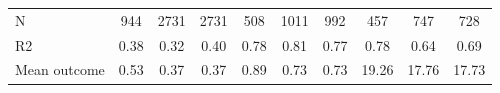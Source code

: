 \begin{tabular}{lccc|ccc|ccc}
N           &         944         &        2731         &        2731         &         508         &        1011         &         992         &         457         &         747         &         728         \\
R2          &        0.38         &        0.32         &        0.40         &        0.78         &        0.81         &        0.77         &        0.78         &        0.64         &        0.69         \\
Mean outcome&        0.53         &        0.37         &        0.37         &        0.89         &        0.73         &        0.73         &       19.26         &       17.76         &       17.73         \\
\bottomrule \end{tabular}
